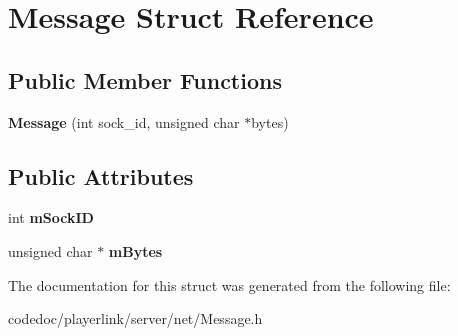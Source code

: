 \hypertarget{structMessage}{}\section{Message Struct Reference}
\label{structMessage}
\subsection*{Public Member Functions}
\begin{DoxyCompactItemize}
\item 
\mbox{\label{structMessage_a16d75dab0888b7d4ef2ed1a63a331ce5}} 
{\bfseries Message} (int sock\+\_\+id, unsigned char $\ast$bytes)
\end{DoxyCompactItemize}
\subsection*{Public Attributes}
\begin{DoxyCompactItemize}
\item 
\mbox{\label{structMessage_a0877d09164637c08aa2a79a987b135ef}} 
int {\bfseries m\+Sock\+ID}
\item 
\mbox{\label{structMessage_a345686bb146febf2ee4b9f390ea39328}} 
unsigned char $\ast$ {\bfseries m\+Bytes}
\end{DoxyCompactItemize}


The documentation for this struct was generated from the following file\+:\begin{DoxyCompactItemize}
\item 
codedoc/playerlink/server/net/Message.\+h\end{DoxyCompactItemize}
